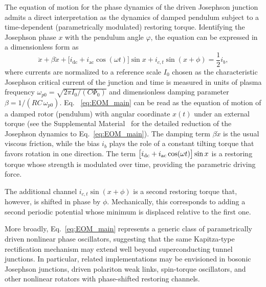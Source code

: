 \documentclass[prl,twocolumn,superscriptaddress,showpacs,nofootinbib]{revtex4-2}
\begin{document}
The equation of motion for the phase dynamics of the driven Josephson junction admits a direct interpretation as the dynamics of damped pendulum subject to a time-dependent (parametrically modulated) restoring torque. Identifying the Josephson phase $x$ with the pendulum angle $\varphi$, the equation can be expressed in a dimensionless form as
\begin{equation}
\ddot x + \beta \dot x
+ \big[i_{\mathrm{dc}}+i_{\mathrm{ac}}\cos(\omega t)\big]\sin x
+ i_{c,t} \sin(x+\phi)
= \frac{1}{2} i_b ,
\label{eq:EOM_main}
\end{equation}
where currents are normalized to a reference scale $I_0$ chosen as the characteristic Josephson critical current of the junction and time is measured in units of plasma frequency $\omega_{p0}=\sqrt{2\pi I_0/(C\Phi_0)}$ and dimensionless damping parameter $\beta = 1/(RC\,\omega_{p0})$. Eq. ~\eqref{eq:EOM_main} can be read as the equation of motion of a damped
rotor (pendulum) with angular coordinate $x(t)$ under an external torque (see the Supplemental Material~\cite{SM} for the detailed reduction of the Josephson dynamics to Eq.~\eqref{eq:EOM_main}).
The damping term $\beta\dot x$ is the usual viscous friction, while the bias $i_b$ plays the role of a constant tilting torque that favors rotation in one direction. The term $\big[i_{\rm dc}+i_{\rm ac}\cos(\omega t)\big]\sin x$ is a restoring torque whose strength is modulated over time, providing the parametric driving force.

The additional channel $i_{c,t}\sin(x+\phi)$ is a second restoring torque that, however, is shifted in phase by $\phi$. Mechanically, this corresponds to
adding a second periodic potential whose minimum is displaced relative to the first one.

More broadly, Eq.~\eqref{eq:EOM_main} represents a generic class of parametrically driven nonlinear phase oscillators, suggesting that the same Kapitza-type rectification mechanism may extend well beyond superconducting tunnel junctions. In particular, related implementations may be envisioned in bosonic Josephson
junctions, driven polariton weak links, spin-torque oscillators, and other nonlinear rotators with phase-shifted restoring channels.
\end{document}
